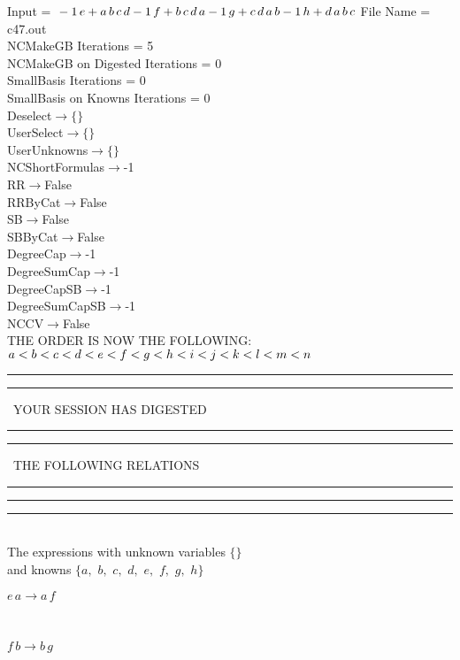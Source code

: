 \documentclass[rep10,leqno]{report}
\begin{document}
\normalsize
\baselineskip=12pt
\noindent
Input = 
$
\\-1\,
 e + a\,
 b\,
 c\,
 d\\
-1\,
 f + b\,
 c\,
 d\,
 a\\
-1\,
 g + c\,
 d\,
 a\,
 b\\
-1\,
 h + d\,
 a\,
 b\,
 c\\
$
File Name = c47.out\\
NCMakeGB Iterations = 5\\
NCMakeGB on Digested Iterations = 0\\
SmallBasis Iterations = 0\\
SmallBasis on Knowns Iterations = 0\\
Deselect$\rightarrow \{\}$\\
UserSelect$\rightarrow \{\}$\\
UserUnknowns$\rightarrow \{\}$\\
NCShortFormulas$\rightarrow$-1\\
RR$\rightarrow $False\\
RRByCat$\rightarrow $False\\
SB$\rightarrow $False\\
SBByCat$\rightarrow $False\\
DegreeCap$\rightarrow $-1\\
DegreeSumCap$\rightarrow $-1\\
DegreeCapSB$\rightarrow $-1\\
DegreeSumCapSB$\rightarrow $-1\\
NCCV$\rightarrow $False\\
THE ORDER IS NOW THE FOLLOWING:\hfil\break
$
a<b<c<d<e<f<g<h<i<j<k<l<m<n\\
$
\rule[2pt]{6in}{4pt}\hfil\break
\rule[2pt]{1.879in}{4pt}
\ YOUR SESSION HAS DIGESTED\ 
\rule[2pt]{1.879in}{4pt}\hfil\break
\rule[2pt]{1.923in}{4pt}
\ THE FOLLOWING RELATIONS\ 
\rule[2pt]{1.923in}{4pt}\hfil\break
\rule[2pt]{6in}{4pt}\hfil\break
\rule[3pt]{6in}{.7pt}\\
The expressions with unknown variables $\{\}$\\
and knowns $\{a,
$ $
b,
$ $
c,
$ $
d,
$ $
e,
$ $
f,
$ $
g,
$ $
h\}$\smallskip\\
\begin{minipage}{6in}
$
e\,
 a\rightarrow a\,
 f
$
\end{minipage}\medskip \\
\begin{minipage}{6in}
$
f\,
 b\rightarrow b\,
 g
$
\end{minipage}\medskip \\
\end{document}
